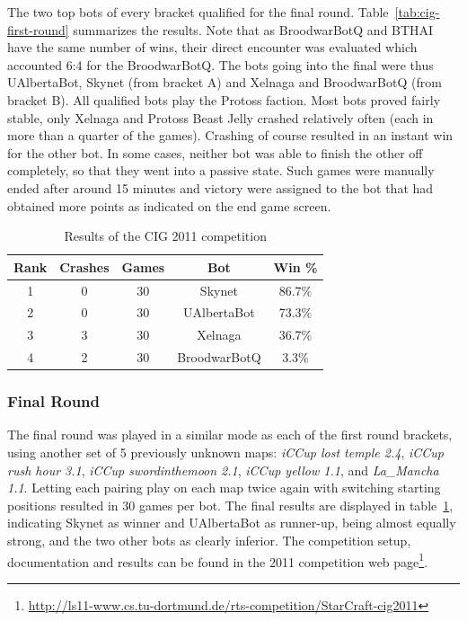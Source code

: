\documentclass{llncs}
\begin{document}
The two top bots of every bracket qualified
for the final round. Table~\ref{tab:cig-first-round} summarizes
the results.
Note that as BroodwarBotQ and BTHAI have the same number of wins,
their direct encounter was evaluated which accounted 6:4 for the BroodwarBotQ.
The bots going into the final were thus UAlbertaBot, Skynet (from bracket A)
and Xelnaga and BroodwarBotQ (from bracket B). All qualified bots play the
Protoss faction. Most bots proved fairly stable, only Xelnaga and Protoss 
Beast Jelly crashed relatively often (each in more than a quarter of the games). 
Crashing of course resulted in an instant win for the other bot.
In some cases, neither bot was able to finish the other off completely,
so that they went into a passive state. Such games were manually ended after
around 15 minutes and victory were assigned to the bot that had obtained more
points as indicated on the end game screen.

\begin{table}[!b]
\caption{Results of the CIG 2011 competition}
\label{tab:cig-final-round}
\centering
\begin{tabular}{|c|c|c|c|c|}
\hline
{\bfseries Rank} & {\bfseries Crashes} & {\bfseries Games} & {\bfseries Bot} & {\bfseries Win \%} \\
\hline
1 & 0 &  30 &  Skynet       &  86.7\%\\
2 & 0 &  30 &  UAlbertaBot  &  73.3\%\\
3 & 3 &  30 &  Xelnaga      &  36.7\%\\
4 & 2 &  30 &  BroodwarBotQ   &  3.3\%\\
\hline
\end{tabular}
\end{table}



\subsubsection*{Final Round}
\label{sec:cig-final-round}

The final round was played in a similar mode as each of the
first round brackets,
using another set of 5 previously unknown maps:
\emph{iCCup lost temple 2.4}, \emph{iCCup rush hour 3.1},
\emph{iCCup swordinthemoon 2.1}, \emph{iCCup yellow 1.1},
and \emph{La\_Mancha 1.1}. 
Letting each pairing play on each map twice again with
switching starting positions resulted in 30 games per bot.
The final results are displayed in table~\ref{tab:cig-final-round},
indicating Skynet as winner and UAlbertaBot as runner-up, being
almost equally strong, and the two other bots as clearly inferior.
The competition setup, documentation and results can be found
in the 2011 competition web page\footnote{\url{http://ls11-www.cs.tu-dortmund.de/rts-competition/StarCraft-cig2011}}.
\end{document}
